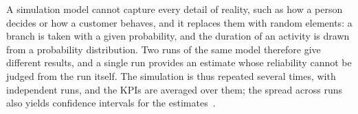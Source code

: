     A simulation model cannot capture every detail of reality, such as how a
    person decides or how a customer behaves, and it replaces them with random
    elements: a branch is taken with a given probability, and the duration of an
    activity is drawn from a probability
    distribution. Two runs of the same model
    therefore give different results, and a single run provides an estimate whose
    reliability cannot be judged from the run itself. The simulation is thus
    repeated several times, with independent runs, and the KPIs are averaged over
    them; the spread across runs also yields confidence intervals for the
    estimates~\cite{vanderaalst2015simulation}.




